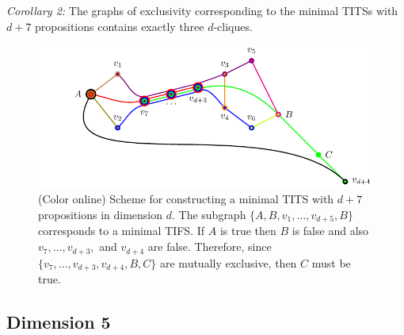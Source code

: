 \documentclass[%
 twocolumn,
 groupedaddress,
 showpacs,
 showkeys,
 preprintnumbers,
 amsmath,amssymb,
 aps,
 pra,
 longbibliography,
 floatfix,
 ]{revtex4-1}
\begin{document}
{\em Corollary 2:} The graphs of exclusivity corresponding to the minimal TITSs with $d+7$ propositions contains exactly three $d$-cliques.


\begin{figure}
\centerline{\includegraphics[width=\columnwidth]{2018-minimalYIYS_pra_15REVISEDJR-Fig6.pdf}}
\caption{\label{fig:scheme}(Color online) Scheme for constructing a minimal TITS with $d+7$ propositions in dimension $d$. The subgraph $\{A,B,v_1,\dots,v_{d+5},B\}$ corresponds to a minimal TIFS. If $A$ is true then $B$ is false and also $v_7,\dots,v_{d+3},$ and $v_{d+4}$ are false. Therefore, since $\{v_7,\dots,v_{d+3},v_{d+4},B,C\}$ are mutually exclusive, then $C$ must be true.}
\end{figure}


\subsection{Dimension 5}

\end{document}
